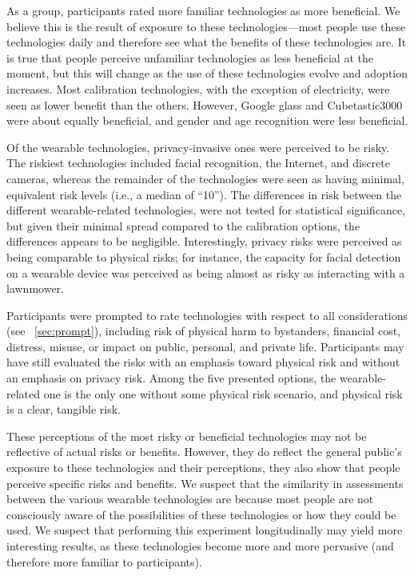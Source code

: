 As a group, participants rated more familiar technologies as more beneficial. We believe this is the result of exposure to these technologies---most people use these technologies daily and therefore see what the benefits of these technologies are. It is true that people perceive unfamiliar technologies as less beneficial at the moment, but this will change as the use of these technologies evolve and adoption increases. Most calibration technologies, with the exception of electricity, were seen as lower benefit than the others. However, Google glass and Cubetastic3000 were about equally beneficial, and gender and age recognition were less beneficial. 

Of the wearable technologies, privacy-invasive ones were perceived to be risky. The riskiest technologies included facial recognition, the Internet, and discrete cameras, whereas the remainder of the technologies were seen as having minimal, equivalent risk levels (i.e., a median of ``10''). The differences in risk between the different wearable-related technologies, were not tested for statistical significance, but given their minimal spread compared to the calibration options, the differences appears to be negligible. Interestingly, privacy risks were perceived as being comparable to physical risks; for instance, the capacity for facial detection on a wearable device was perceived as being almost as risky as interacting with a lawnmower. 

Participants were prompted to rate technologies with respect to all considerations (see ~\ref{sec:prompt}), including risk of physical harm to bystanders, financial cost, distress, misuse, or impact on public, personal, and private life. Participants may have still evaluated the risks with an emphasis toward physical risk and without an emphasis on privacy risk. Among the five presented options, the wearable-related one is the only one without some physical risk scenario, and physical risk is a clear, tangible risk. 

These perceptions of the most risky or beneficial technologies may not be reflective of actual risks or benefits. However, they do reflect the general public's exposure to these technologies and their perceptions, they also show that people perceive specific risks and benefits. We suspect that the similarity in assessments between the various wearable technologies are because most people are not consciously aware of the possibilities of these technologies or how they could be used. We suspect that performing this experiment longitudinally may yield more interesting results, as these technologies become more and more pervasive (and therefore more familiar to participants).

